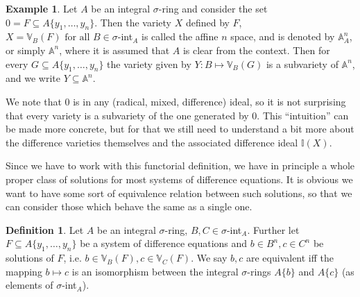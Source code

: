 \documentclass{article}
\def\I{\mathbb{I}}
\def\VV{\mathbb{V}}
\def\s{\sigma}
\def\fa{\text{ for all }}
\theoremstyle{definition}
\newtheorem{ex}[Satz]{Example}
\newtheorem{defn}[Satz]{Definition}
\newtheorem{lem}[Satz]{Lemma}
\begin{document}
\begin{ex}\label{A^n}
Let $A$ be an integral $\s$-ring and consider the set $0 = F \subseteq A\{y_1,\ldots,y_n\}$. Then the variety $X$ defined by $F$, $X = \VV_B(F) \fa B \in \s$-int$_A$ is called the affine $n$ space, and is denoted by $\mathbb{A}^n_A$, 
or simply $\mathbb{A}^n$, where it is assumed that $A$ is clear from the context. Then for every $G \subseteq A\{y_1,\ldots,y_n\}$ the variety given by $Y: B \mapsto \VV_B(G)$ is a subvariety of $\mathbb{A}^n$, 
and we write $Y \subseteq \mathbb{A}^n$.
\end{ex}

We note that $0$ is in any (radical, mixed, difference) ideal, so it is not surprising that every variety is a subvariety of the one generated by $0$. This ``intuition'' can be made more concrete, 
but for that we still need to understand a bit more about the difference varieties themselves and the associated difference ideal $\I(X)$. 

Since we have to work with this functorial definition, we have in principle a whole proper class of solutions for most systems of difference equations. 
It is obvious we want to have some sort of equivalence relation between such solutions, so that we can consider those which behave the same as a single one.

\begin{defn}\label{equivsols}
Let $A$ be an integral $\s$-ring, $B,C \in \s$-int$_A$. Further let $F \subseteq A\{y_1,\ldots,y_n\}$ be a system of difference equations and $b \in B^n, c \in C^n$ be solutions of $F$, i.e. $b \in \VV_B(F), c \in \VV_C(F)$.
We say $b,c$ are equivalent iff the mapping $b \mapsto c$ is an isomorphism between the integral $\s$-rings $A\{b\}$ and $A\{c\}$  (as elements of $\s$-int$_A$). 
\end{defn}

\end{document}

